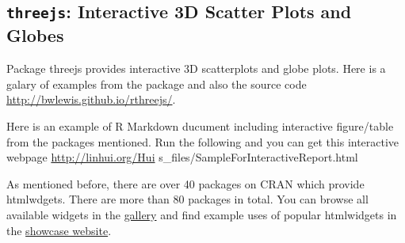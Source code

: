 \documentclass[]{book}
\newenvironment{Shaded}{\begin{snugshade}}{\end{snugshade}}
\newcommand{\KeywordTok}[1]{\textcolor[rgb]{0.13,0.29,0.53}{\textbf{{#1}}}}
\newcommand{\DataTypeTok}[1]{\textcolor[rgb]{0.13,0.29,0.53}{{#1}}}
\newcommand{\DecValTok}[1]{\textcolor[rgb]{0.00,0.00,0.81}{{#1}}}
\newcommand{\StringTok}[1]{\textcolor[rgb]{0.31,0.60,0.02}{{#1}}}
\newcommand{\OtherTok}[1]{\textcolor[rgb]{0.56,0.35,0.01}{{#1}}}
\newcommand{\NormalTok}[1]{{#1}}
\theoremstyle{definition}
\theoremstyle{definition}
\theoremstyle{remark}
\begin{document}
\hypertarget{htmlwidget-7c6834f9819f80d4c73e}{}

\subsection{\texorpdfstring{\texttt{threejs}: Interactive 3D Scatter
Plots and
Globes}{threejs: Interactive 3D Scatter Plots and Globes}}\label{threejs-interactive-3d-scatter-plots-and-globes}

Package threejs provides interactive 3D scatterplots and globe plots.
Here is a galary of examples from the package and also the source code
\url{http://bwlewis.github.io/rthreejs/}.

Here is an example of R Markdown ducument including interactive
figure/table from the packages mentioned. Run the following and you can
get this interactive webpage \url{http://linhui.org/Hui}
s\_files/SampleForInteractiveReport.html

\begin{Shaded}
\end{Shaded}

\hypertarget{htmlwidget-0bc628cd505304b00452}{}

As mentioned before, there are over 40 packages on CRAN which provide
htmlwdgets. There are more than 80 packages in total. You can browse all
available widgets in the \href{http://gallery.htmlwidgets.org/}{gallery}
and find example uses of popular htmlwidgets in the
\href{http://www.htmlwidgets.org/showcase_leaflet.html}{showcase
website}.
\end{document}
